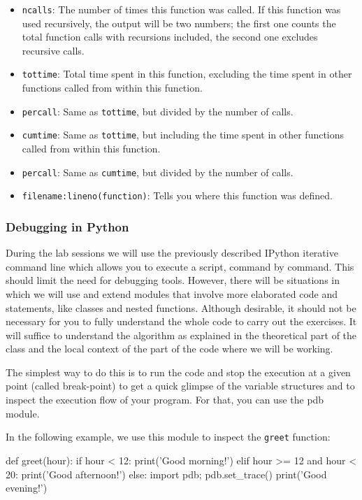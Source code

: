\begin{itemize}
\item \texttt{ncalls}: The number of times this function was called. If this function was used recursively, the output will be two numbers; the first one counts the total function calls with recursions included, the second one excludes recursive calls.
\item \texttt{tottime}: Total time spent in this function, excluding the time spent in other functions called from within this function.
\item \texttt{percall}: Same as \texttt{tottime}, but divided by the number of calls.
\item \texttt{cumtime}: Same as \texttt{tottime}, but including the time spent in other functions called from within this function.
\item \texttt{percall}: Same as \texttt{cumtime}, but divided by the number of calls.
\item \texttt{filename:lineno(function)}: Tells you where this function was defined.
\end{itemize}

\subsubsection{Debugging in Python}

During the lab sessions we will use the previously described IPython iterative
command line which allows you to execute a script, command by command. This
should limit the need for debugging tools. However, there will be situations in
which we will use and extend modules that involve more elaborated code and
statements, like classes and nested functions. Although desirable, it should
not be necessary for you to fully understand the whole code to carry out the
exercises. It will suffice to understand the algorithm as explained in the
theoretical part of the class and the local context of the part of the code
where we will be working. 

The simplest way to do this is to run the code and stop the execution at a
given point (called break-point) to get a quick glimpse of the variable
structures and to inspect the execution flow of your program. For that, you can
use the pdb module. 

In the following example, we use this module to inspect the \texttt{greet} function:

\begin{python}
def greet(hour):
    if hour < 12:
        print('Good morning!')
    elif hour >= 12 and hour < 20:
        print('Good afternoon!')
    else:
        import pdb; pdb.set_trace()
        print('Good evening!')
\end{python}

